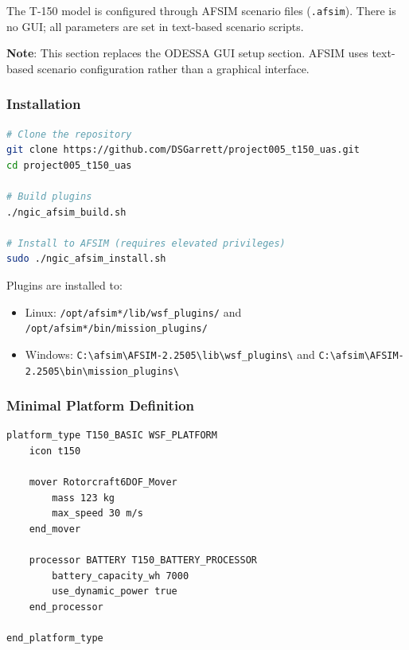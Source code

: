 \unclass The T-150 model is configured through AFSIM scenario files (\texttt{.afsim}). There is no GUI; all parameters are set in text-based scenario scripts.

\unclass \textbf{Note}: This section replaces the ODESSA GUI setup section. AFSIM uses text-based scenario configuration rather than a graphical interface.

\subsubsection{\unclass Installation}\label{sec:Installation}

\begin{codebox}
\begin{lstlisting}[language=bash]
# Clone the repository
git clone https://github.com/DSGarrett/project005_t150_uas.git
cd project005_t150_uas

# Build plugins
./ngic_afsim_build.sh

# Install to AFSIM (requires elevated privileges)
sudo ./ngic_afsim_install.sh
\end{lstlisting}
\end{codebox}

\unclass Plugins are installed to:
\begin{itemize}
	\item \unclass Linux: \texttt{/opt/afsim*/lib/wsf\_plugins/} and \texttt{/opt/afsim*/bin/mission\_plugins/}
	\item \unclass Windows: \texttt{C:\textbackslash{}afsim\textbackslash{}AFSIM-2.2505\textbackslash{}lib\textbackslash{}wsf\_plugins\textbackslash{}} and \texttt{C:\textbackslash{}afsim\textbackslash{}AFSIM-2.2505\textbackslash{}bin\textbackslash{}mission\_plugins\textbackslash{}}
\end{itemize}

\subsubsection{\unclass Minimal Platform Definition}\label{sec:MinimalPlatform}

\begin{codebox}
\begin{lstlisting}
platform_type T150_BASIC WSF_PLATFORM
    icon t150

    mover Rotorcraft6DOF_Mover
        mass 123 kg
        max_speed 30 m/s
    end_mover

    processor BATTERY T150_BATTERY_PROCESSOR
        battery_capacity_wh 7000
        use_dynamic_power true
    end_processor

end_platform_type
\end{lstlisting}
\end{codebox}

